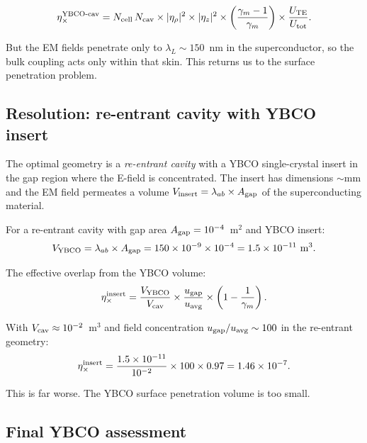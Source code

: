 \documentclass[11pt]{article}
\newcommand{\ee}[1]{\times 10^{#1}}
\begin{document}
\begin{equation}
\eta_\times^{\rm YBCO\text{-}cav} = N_{\rm cell}\,N_{\rm cav}
\times |\eta_\rho|^2 \times |\eta_z|^2
\times \left(\frac{\gamma_m - 1}{\gamma_m}\right)
\times \frac{U_{\rm TE}}{U_{\rm tot}}.
\end{equation}

But the EM fields penetrate only to $\lambda_L \sim 150$~nm in
the superconductor, so the bulk coupling acts only within that
skin. This returns us to the surface penetration problem.

\subsection{Resolution: re-entrant cavity with YBCO insert}

The optimal geometry is a \emph{re-entrant cavity} with a YBCO
single-crystal insert in the gap region where the E-field is
concentrated. The insert has dimensions $\sim$mm and the EM field
permeates a volume $V_{\rm insert} = \lambda_{ab} \times A_{\rm gap}$
of the superconducting material.

For a re-entrant cavity with gap area $A_{\rm gap} = 10^{-4}$~m$^2$
and YBCO insert:
\begin{equation}
V_{\rm YBCO} = \lambda_{ab} \times A_{\rm gap}
= 150\ee{-9} \times 10^{-4} = 1.5\ee{-11}\text{ m}^3.
\end{equation}

The effective overlap from the YBCO volume:
\begin{equation}
\eta_\times^{\rm insert} = \frac{V_{\rm YBCO}}{V_{\rm cav}}
\times \frac{u_{\rm gap}}{u_{\rm avg}} \times \left(1 - \frac{1}{\gamma_m}\right).
\end{equation}

With $V_{\rm cav} \approx 10^{-2}$~m$^3$ and
field concentration $u_{\rm gap}/u_{\rm avg} \sim 100$ in the
re-entrant geometry:
\begin{equation}
\eta_\times^{\rm insert} = \frac{1.5\ee{-11}}{10^{-2}}
\times 100 \times 0.97 = 1.46\ee{-7}.
\end{equation}

This is far worse. The YBCO surface penetration volume is too small.

\subsection{Final YBCO assessment}
\end{document}
